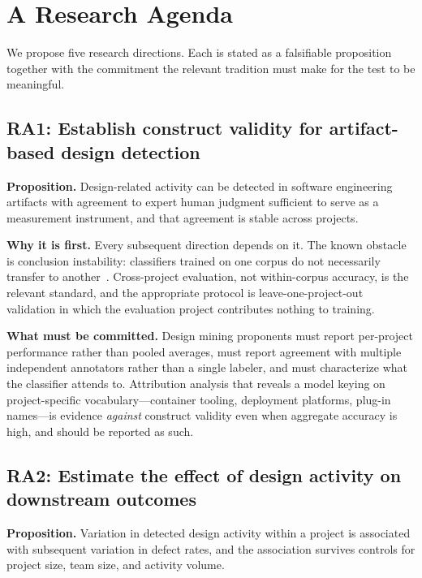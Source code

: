 \documentclass[11pt,a4paper]{article}
\begin{document}
\section{A Research Agenda}
\label{sec:agenda}

We propose five research directions. Each is stated as a falsifiable proposition
together with the commitment the relevant tradition must make for the test to be
meaningful.

\subsection{RA1: Establish construct validity for artifact-based design detection}

\textbf{Proposition.} Design-related activity can be detected in software
engineering artifacts with agreement to expert human judgment sufficient to
serve as a measurement instrument, and that agreement is stable across projects.

\textbf{Why it is first.} Every subsequent direction depends on it. The known
obstacle is conclusion instability: classifiers trained on one corpus do not
necessarily transfer to another~\citep{mahadi2021}. Cross-project evaluation, not
within-corpus accuracy, is the relevant standard, and the appropriate protocol
is leave-one-project-out validation in which the evaluation project contributes
nothing to training.

\textbf{What must be committed.} Design mining proponents must report per-project
performance rather than pooled averages, must report agreement with multiple
independent annotators rather than a single labeler, and must characterize what
the classifier attends to. Attribution analysis that reveals a model keying on
project-specific vocabulary---container tooling, deployment platforms, plug-in
names---is evidence \emph{against} construct validity even when aggregate
accuracy is high, and should be reported as such.

\subsection{RA2: Estimate the effect of design activity on downstream outcomes}

\textbf{Proposition.} Variation in detected design activity within a project is
associated with subsequent variation in defect rates, and the association
survives controls for project size, team size, and activity volume.
\end{document}
